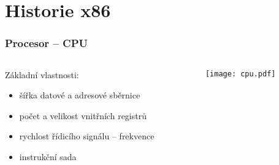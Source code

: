 \documentclass{beamer}
\subtitle{Lekce 11. Architektura x86}
\author{Petr Štěpán\\ \small\texttt{stepan@fel.cvut.cz}}
\begin{document}
\maketitle

\section{Historie x86}

\begin{frame}
\frametitle{Procesor -- CPU}
\begin{columns}[t,onlytextwidth]
\begin{column}{0.4\textwidth}
Základní vlastnosti:
  \begin{itemize}
    \item šířka datové a adresové sběrnice
    \item počet a velikost vnitřních registrů
    \item rychlost řídicího signálu – frekvence
    \item instrukční sada
  \end{itemize}
\end{column}
\begin{column}{0.52\textwidth}  
   \begin{center}
   \texttt{[image: cpu.pdf]}
   \end{center}
\end{column}
\end{columns}
\end{frame}
\end{document}
